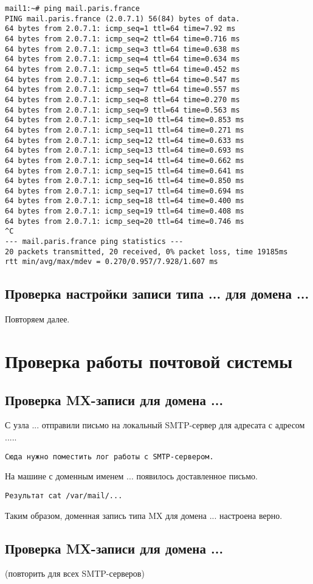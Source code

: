 \documentclass[a4paper,12pt]{article}
\begin{document}
\begin{verbatim}
mail1:~# ping mail.paris.france
PING mail.paris.france (2.0.7.1) 56(84) bytes of data.
64 bytes from 2.0.7.1: icmp_seq=1 ttl=64 time=7.92 ms
64 bytes from 2.0.7.1: icmp_seq=2 ttl=64 time=0.716 ms
64 bytes from 2.0.7.1: icmp_seq=3 ttl=64 time=0.638 ms
64 bytes from 2.0.7.1: icmp_seq=4 ttl=64 time=0.634 ms
64 bytes from 2.0.7.1: icmp_seq=5 ttl=64 time=0.452 ms
64 bytes from 2.0.7.1: icmp_seq=6 ttl=64 time=0.547 ms
64 bytes from 2.0.7.1: icmp_seq=7 ttl=64 time=0.557 ms
64 bytes from 2.0.7.1: icmp_seq=8 ttl=64 time=0.270 ms
64 bytes from 2.0.7.1: icmp_seq=9 ttl=64 time=0.563 ms
64 bytes from 2.0.7.1: icmp_seq=10 ttl=64 time=0.853 ms
64 bytes from 2.0.7.1: icmp_seq=11 ttl=64 time=0.271 ms
64 bytes from 2.0.7.1: icmp_seq=12 ttl=64 time=0.633 ms
64 bytes from 2.0.7.1: icmp_seq=13 ttl=64 time=0.693 ms
64 bytes from 2.0.7.1: icmp_seq=14 ttl=64 time=0.662 ms
64 bytes from 2.0.7.1: icmp_seq=15 ttl=64 time=0.641 ms
64 bytes from 2.0.7.1: icmp_seq=16 ttl=64 time=0.850 ms
64 bytes from 2.0.7.1: icmp_seq=17 ttl=64 time=0.694 ms
64 bytes from 2.0.7.1: icmp_seq=18 ttl=64 time=0.400 ms
64 bytes from 2.0.7.1: icmp_seq=19 ttl=64 time=0.408 ms
64 bytes from 2.0.7.1: icmp_seq=20 ttl=64 time=0.746 ms
^C
--- mail.paris.france ping statistics ---
20 packets transmitted, 20 received, 0% packet loss, time 19185ms
rtt min/avg/max/mdev = 0.270/0.957/7.928/1.607 ms
\end{verbatim}

\subsection{Проверка настройки записи типа ... для домена ...}

Повторяем далее.

\section{Проверка работы почтовой системы}

\subsection{Проверка MX-записи для домена ...}

С узла ... отправили письмо на локальный SMTP-сервер для адресата с адресом .....

\begin{verbatim}
Сюда нужно поместить лог работы с SMTP-сервером.
\end{verbatim}

На машине с доменным именем ... появилось доставленное письмо.
\begin{verbatim}
Результат cat /var/mail/...
\end{verbatim}

Таким образом, доменная запись типа MX для домена ... настроена верно.

\subsection{Проверка MX-записи для домена ...}

(повторить для всех SMTP-серверов)
\end{document}
